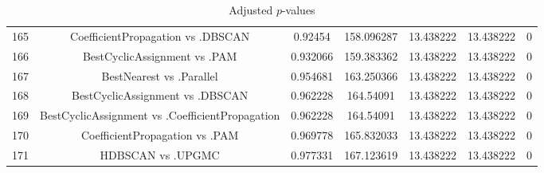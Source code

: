 \documentclass[a4paper,10pt]{article}
\begin{document}
\begin{landscape}
\begin{table}[!htp]
\begin{tabular}{ccccccc}
165&CoefficientPropagation vs .DBSCAN&0.92454&158.096287&13.438222&13.438222&0\\
166&BestCyclicAssignment vs .PAM&0.932066&159.383362&13.438222&13.438222&0\\
167&BestNearest vs .Parallel&0.954681&163.250366&13.438222&13.438222&0\\
168&BestCyclicAssignment vs .DBSCAN&0.962228&164.54091&13.438222&13.438222&0\\
169&BestCyclicAssignment vs .CoefficientPropagation&0.962228&164.54091&13.438222&13.438222&0\\
170&CoefficientPropagation vs .PAM&0.969778&165.832033&13.438222&13.438222&0\\
171&HDBSCAN vs .UPGMC&0.977331&167.123619&13.438222&13.438222&0\\
\hline
\end{tabular}
\caption{Adjusted $p$-values}
\end{table}

\end{landscape}
\end{document}

